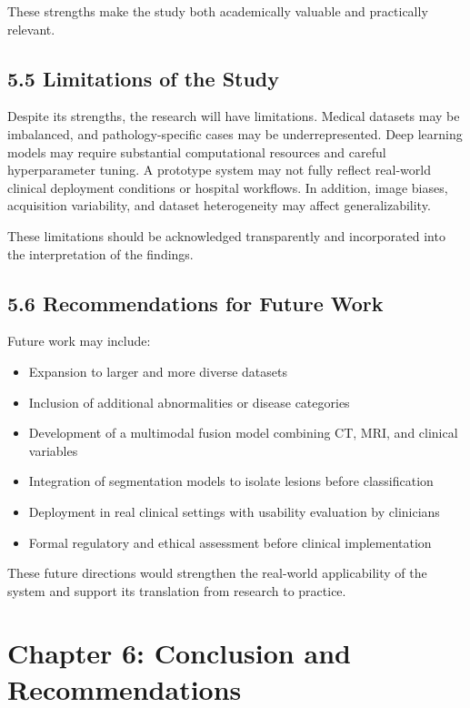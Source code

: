 \documentclass[12pt,a4paper]{report}
\begin{document}
These strengths make the study both academically valuable and practically relevant.

\section{5.5 Limitations of the Study}

Despite its strengths, the research will have limitations. Medical datasets may be imbalanced, and pathology-specific cases may be underrepresented. Deep learning models may require substantial computational resources and careful hyperparameter tuning. A prototype system may not fully reflect real-world clinical deployment conditions or hospital workflows. In addition, image biases, acquisition variability, and dataset heterogeneity may affect generalizability.

These limitations should be acknowledged transparently and incorporated into the interpretation of the findings.

\section{5.6 Recommendations for Future Work}

Future work may include:

\begin{itemize}
\item Expansion to larger and more diverse datasets
\item Inclusion of additional abnormalities or disease categories
\item Development of a multimodal fusion model combining CT, MRI, and clinical variables
\item Integration of segmentation models to isolate lesions before classification
\item Deployment in real clinical settings with usability evaluation by clinicians
\item Formal regulatory and ethical assessment before clinical implementation
\end{itemize}

These future directions would strengthen the real-world applicability of the system and support its translation from research to practice.


\chapter{Chapter 6: Conclusion and Recommendations}
\end{document}
